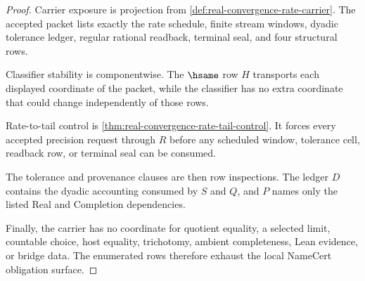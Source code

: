 \begin{proof}
Carrier exposure is projection from \autoref{def:real-convergence-rate-carrier}. The accepted packet lists exactly the rate schedule, finite stream windows, dyadic tolerance ledger, regular rational readback, terminal seal, and four structural rows.

Classifier stability is componentwise. The $\hsame$ row $H$ transports each displayed coordinate of the packet, while the classifier has no extra coordinate that could change independently of those rows.

Rate-to-tail control is \autoref{thm:real-convergence-rate-tail-control}. It forces every accepted precision request through $R$ before any scheduled window, tolerance cell, readback row, or terminal seal can be consumed.

The tolerance and provenance clauses are then row inspections. The ledger $D$ contains the dyadic accounting consumed by $S$ and $Q$, and $P$ names only the listed Real and Completion dependencies.

Finally, the carrier has no coordinate for quotient equality, a selected limit, countable choice, host equality, trichotomy, ambient completeness, Lean evidence, or bridge data. The enumerated rows therefore exhaust the local NameCert obligation surface.
\end{proof}





